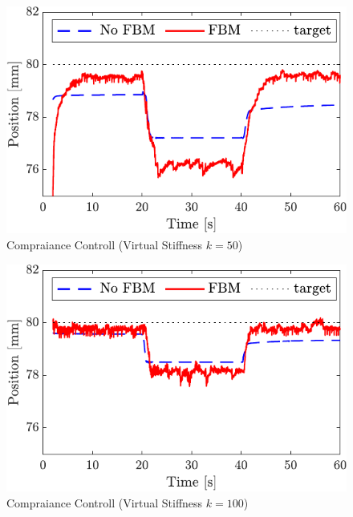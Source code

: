 \begin{figure}[t]
    \centering
        \includegraphics[keepaspectratio, scale=1.0]{contents/IntegrationControl/figure/compra/compra_k50-crop.pdf}
        \caption{Compraiance Controll (Virtual Stiffness $k=50$)}
        \label{fig:compra_k50-crop}
\end{figure}
\begin{figure}[t]
    \centering
        \includegraphics[keepaspectratio, scale=1.0]{contents/IntegrationControl/figure/compra/compra_k100-crop.pdf}
        \caption{Compraiance Controll (Virtual Stiffness $k=100$)}
        \label{fig:compra_k100-crop}
\end{figure}


